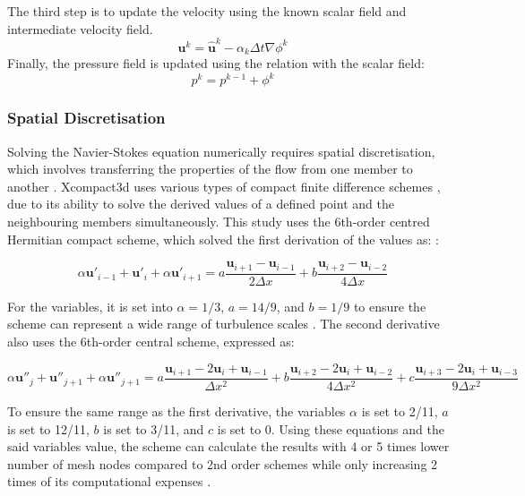 The third step is to update the velocity using the known scalar field and intermediate velocity field.
\begin{equation}
	\mathbf{u}^k = \hat{\mathbf{u}}^{k} - \alpha_k \Delta t \nabla \phi^{k}
\end{equation}
Finally, the pressure field is updated using the relation with the scalar field:
\begin{equation}
	p^k = p^{k-1} + \phi^k
\end{equation}


\subsubsection{Spatial Discretisation}
Solving the Navier-Stokes equation numerically requires spatial discretisation, which involves transferring the properties of the flow from one member to another \cite{Hawez2021}. Xcompact3d uses various types of compact finite difference schemes \cite{Laizet2009}, due to its ability to solve the derived values of a defined point and the neighbouring members simultaneously. This study uses the 6th-order centred Hermitian compact scheme, which solved the first derivation of the values as: \cite{Laizet2024UserGuide}:

\begin{equation}
	\alpha \mathbf{u}'_{i-1} + \mathbf{u}'_{i} + \alpha \mathbf{u}'_{i+1} = a \frac{\mathbf{u}_{i+1} - \mathbf{u}_{i-1}}{2 \Delta x} + b \frac{\mathbf{u}_{i+2} - \mathbf{u}_{i-2}}{4 \Delta x}
	\label{eq:6orderHOC}
\end{equation}

For the variables, it is set into $\alpha = 1/3$, $a = 14/9$, and $b = 1/9$ to ensure the scheme can represent a wide range of turbulence scales \cite{Laizet2009}. The second derivative also uses the 6th-order central scheme, expressed as:

\begin{equation}
	\alpha \mathbf{u}''_{j}+ \mathbf{u}''_{j+1} + \alpha \mathbf{u}''_{j+1} = a \frac{\mathbf{u}_{i+1} - 2\mathbf{u}_{i} + \mathbf{u}_{i-1}}{\Delta x^2} + b \frac{\mathbf{u}_{i+2} - 2\mathbf{u}_{i} + \mathbf{u}_{i-2}}{4\Delta x^2} + c \frac{\mathbf{u}_{i+3} - 2\mathbf{u}_{i} + \mathbf{u}_{i-3}}{9\Delta x^2}
	\label{eq:6orderHOC2nddev}
\end{equation}

To ensure the same range as the first derivative, the variables $\alpha$ is set to 2/11,  $a$ is set to 12/11, $b$ is set to 3/11, and $c$ is set to 0. Using these equations and the said variables value, the scheme can calculate the results with 4 or 5 times lower number of mesh nodes compared to 2nd order schemes while only increasing 2 times of its computational expenses \cite{Laizet2024}.




